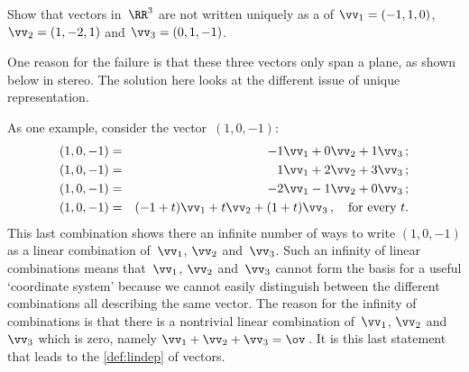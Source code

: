 \begin{example}[3D failure] 
Show that vectors in~\(\RR^3\) are not written uniquely as a  of \(\vv_1=(-1,1,0)\), \(\vv_2=(1,-2,1)\) and \(\vv_3=(0,1,-1)\). 

One reason for the failure is that these three vectors only span a plane, as shown below in stereo.  
The solution here looks at the different issue of unique representation.
\begin{center}
\end{center}
\begin{solution} 
As one example, consider the vector~\((1,0,-1)\):
\begin{eqnarray*}
(1,0,-1)&=&-1\vv_1+0\vv_2+1\vv_3\,;
\\(1,0,-1)&=&1\vv_1+2\vv_2+3\vv_3\,;
\\(1,0,-1)&=&-2\vv_1-1\vv_2+0\vv_3\,;
\\(1,0,-1)&=&(-1+t)\vv_1+t\vv_2+(1+t)\vv_3\,,\quad\text{for every }t.
\end{eqnarray*}
This last combination shows there an infinite number of ways to write \((1,0,-1)\) as a linear combination of~\(\vv_1\), \(\vv_2\) and~\(\vv_3\).
Such an infinity of linear combinations means that~\(\vv_1\), \(\vv_2\) and~\(\vv_3\) cannot form the basis for a useful `coordinate system' because we cannot easily distinguish between the different combinations all describing the same vector.
The reason for the infinity of combinations is that there is a nontrivial linear combination of~\(\vv_1\), \(\vv_2\) and~\(\vv_3\) which is zero, namely \(\vv_1+\vv_2+\vv_3=\ov\)\,.
It is this last statement that leads to the \cref{def:lindep} of  vectors.
\end{solution}
\end{example}





